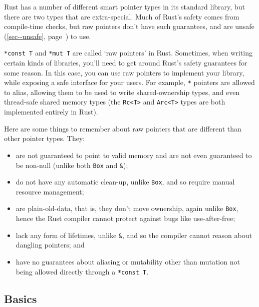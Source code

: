 \documentclass[a4paper,]{book}
\renewcommand*{\hyperref}[2][\ar]{%
  \def\ar{#2}%
  #2 (\autoref{#1}, page~\pageref{#1})}
\begin{document}

Rust has a number of different smart pointer types in its standard
library, but there are two types that are extra-special. Much of Rust's
safety comes from compile-time checks, but raw pointers don't have such
guarantees, and are \hyperref[sec--unsafe]{unsafe} to use.

\texttt{*const\ T} and \texttt{*mut\ T} are called `raw pointers' in
Rust. Sometimes, when writing certain kinds of libraries, you'll need to
get around Rust's safety guarantees for some reason. In this case, you
can use raw pointers to implement your library, while exposing a safe
interface for your users. For example, \texttt{*} pointers are allowed
to alias, allowing them to be used to write shared-ownership types, and
even thread-safe shared memory types (the
\texttt{Rc\textless{}T\textgreater{}} and
\texttt{Arc\textless{}T\textgreater{}} types are both implemented
entirely in Rust).

Here are some things to remember about raw pointers that are different
than other pointer types. They:

\begin{itemize}
\itemsep1pt\parskip0pt
\item
  are not guaranteed to point to valid memory and are not even
  guaranteed to be non-null (unlike both \texttt{Box} and \texttt{\&});
\item
  do not have any automatic clean-up, unlike \texttt{Box}, and so
  require manual resource management;
\item
  are plain-old-data, that is, they don't move ownership, again unlike
  \texttt{Box}, hence the Rust compiler cannot protect against bugs like
  use-after-free;
\item
  lack any form of lifetimes, unlike \texttt{\&}, and so the compiler
  cannot reason about dangling pointers; and
\item
  have no guarantees about aliasing or mutability other than mutation
  not being allowed directly through a \texttt{*const\ T}.
\end{itemize}

\subsection{Basics}\label{basics}
\end{document}
